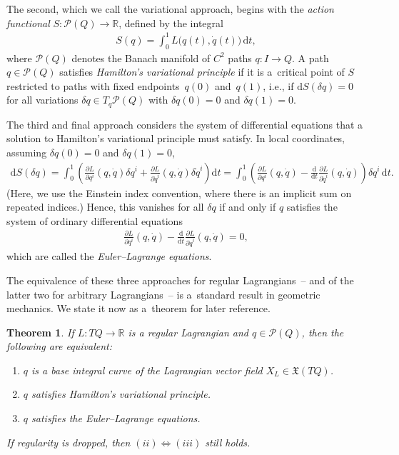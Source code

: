 \documentclass[10pt,a4paper]{amsart}
\numberwithin{equation}{section}
\newtheorem{Theorem}{Theorem}[section]
\begin{document}
The second, which we call the variational approach, begins with the \emph{action functional} $ S \colon \mathcal{P} (Q) \rightarrow \mathbb{R} $, def\/ined by the integral
\begin{gather*}
 S (q) = \int _0 ^1 L \bigl( q (t) , \dot{q} (t) \bigr) \,\mathrm{d}t ,
\end{gather*}
where $ \mathcal{P} (Q) $ denotes the Banach manifold of $ C ^2 $ paths $ q \colon I \rightarrow Q $. A path $q \in \mathcal{P} (Q) $ satisf\/ies \emph{Hamilton's variational principle} if it is a~critical point of $S$ restricted to paths with f\/ixed endpoints~$ q (0) $ and~$ q (1) $, i.e., if $ \mathrm{d} S (\delta q) = 0 $ for all variations $ \delta q \in T _q \mathcal{P} (Q) $ with $ \delta q (0) = 0 $ and $ \delta q (1) = 0 $.

The third and f\/inal approach considers the system of dif\/ferential equations that a solution to Hamilton's variational principle must satisfy. In local coordinates, assuming $ \delta q (0) = 0 $ and $ \delta q (1) = 0 $,
\begin{gather*}
 \mathrm{d} S ( \delta q ) = \int _0 ^1 \left( \frac{ \partial L }{ \partial q ^i } ( q, \dot{q} ) \delta q ^i + \frac{ \partial L }{ \partial \dot{q} ^i } ( q , \dot{q} ) \delta \dot{q} ^i \right) \mathrm{d}t
 = \int _0 ^1 \left( \frac{ \partial L }{ \partial q ^i } ( q, \dot{q} ) - \frac{\mathrm{d}}{\mathrm{d}t} \frac{ \partial L }{ \partial \dot{q}
 ^i } ( q, \dot{q} ) \right) \delta q ^i \,\mathrm{d}t .
\end{gather*}
(Here, we use the Einstein index convention, where there is an implicit sum on repeated indices.) Hence, this vanishes for all $ \delta q $ if and only if $q$ satisf\/ies the system of ordinary dif\/ferential equations
\begin{gather*}
 \frac{ \partial L }{ \partial q ^i } ( q, \dot{q} ) - \frac{\mathrm{d}}{\mathrm{d}t} \frac{ \partial L }{ \partial \dot{q} ^i } ( q, \dot{q} ) = 0,
\end{gather*}
which are called the \emph{Euler--Lagrange equations}.

The equivalence of these three approaches for regular Lagrangians~-- and of the latter two for arbitrary Lagrangians~-- is a~standard result in geometric mechanics. We state it now as a~theorem for later reference.

\begin{Theorem}\label{thm:lagrangian} If $ L \colon T Q \rightarrow \mathbb{R} $ is a regular Lagrangian and $ q \in \mathcal{P} (Q) $, then the following are equivalent:
\begin{enumerate}[label={\rm (\roman*)}]\itemsep=0pt
\item $q$ is a base integral curve of the Lagrangian vector field $ X _L \in \mathfrak{X} ( T Q ) $.

\item $q$ satisfies Hamilton's variational principle.

\item $q$ satisfies the Euler--Lagrange equations.
\end{enumerate}
 If regularity is dropped, then $(ii)\Leftrightarrow (iii)$ still holds.
\end{Theorem}
\end{document}
